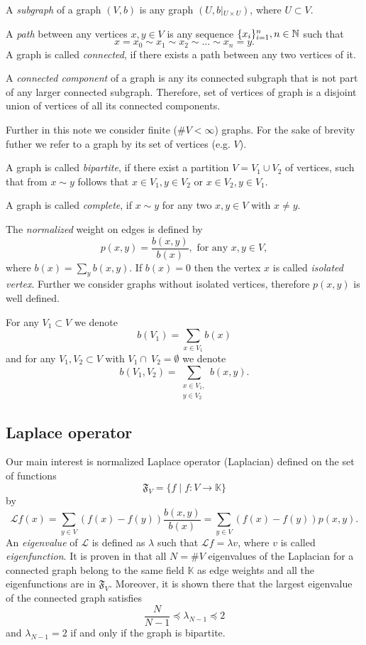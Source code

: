 \documentclass[a4paper,12pt]{amsart}
\theoremstyle{definition}
\newcommand{\K}{\mathbb{K}}
\begin{document}
A {\em subgraph} of a graph $(V,b)$ is any graph $(U,b\left|_{U\times U}\right.)$, where $U\subset V$.

A {\em path} between any vertices $x,y\in V$ is any sequence $\{x_i\}_{i=1}^n, n\in \Bbb N$ such that
$$
x=x_0\sim x_1\sim x_2\sim \dots \sim x_n=y.
$$
A graph is called {\em connected}, if there exists a path between any two vertices of it.


A {\em connected component} of a graph is any its connected subgraph that is not part of any larger connected subgraph. Therefore, set of vertices of graph is a disjoint union of vertices of all its connected components.

Further in this note we consider finite ($\#V<\infty$) graphs. For the sake of brevity futher we refer to a graph by its set of vertices (e.g. $V$).

A graph is called {\em bipartite}, if there exist a partition $V=V_1\cup V_2$ of vertices,
such that from $x\sim y$ follows that $x\in V_1, y\in V_2$ or $x\in V_2, y\in V_1$.

A graph is called {\em complete}, if $x\sim y$ for any two $x,y\in V$ with $x\ne y$.

The \emph{normalized} weight on edges is defined by
\begin{equation}
p(x,y)=\dfrac{b(x,y)}{b(x)}, \mbox{ for any }x,y \in V,
\end{equation}
where $b(x)=\sum_y b(x,y)$. If $b(x)=0$ then the vertex $x$ is called {\em {isolated vertex}}. Further we consider graphs without isolated vertices, therefore $p(x,y)$ is well defined.

For any $V_1\subset V$ we denote
$$
b(V_1)=\sum_{x\in V_1}b(x)$$
and for any $V_1,V_2\subset V$ with $V_1\cap ~V_2=\emptyset$ we denote
$$
b(V_1,V_2)=\sum_{\substack{x\in V_1,\\y\in V_2}}b(x,y).
$$


\subsection{Laplace operator}
Our main interest is {normalized Laplace operator (Laplacian)} defined on the set of functions
$$
\mathfrak F_V=\{f \mid f:V\to \K\}
$$
by 
\begin{equation}
\mathcal L f(x)=\sum_{y\in V} (f(x)-f(y))\dfrac{b(x,y)}{b(x)}=\sum_{y\in V} (f(x)-f(y))p(x,y).
\end{equation}
An {\em eigenvalue} of $\mathcal L$ is defined as $\lambda$ such that $\mathcal Lf=\lambda v$, where $v$ is called {\em eigenfunction}.
It is proven in \cite{MuranovaPreprint22} that all $N=\#V$ eigenvalues of the Laplacian for a connected graph belong to the same field $\K$ as edge weights and all the eigenfunctions are in $\mathfrak F_V$. Moreover, it is shown there that the largest eigenvalue of the connected graph
satisfies
 $$
\dfrac{N}{N-1}\preceq\lambda_{N-1}\preceq 2
$$ and $\lambda_{N-1}=2$ if and only if the graph is bipartite.
\end{document}
